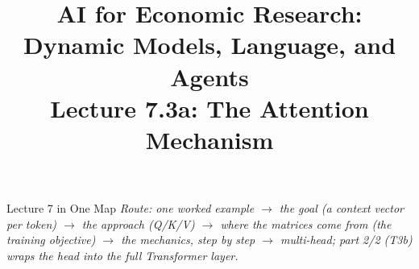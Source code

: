 



\graphicspath{{./pic/}{../../MiniCourse_8hr/Slides/Module3_LLM_Text/pic/}{../}}

\usetikzlibrary{arrows.meta,positioning,shapes,calc,fit,backgrounds}



\title[AI for Econ Research]{AI for Economic Research: Dynamic Models, Language, and Agents\\
Lecture 7.3a: The Attention Mechanism}



\makebeamertitle

\begin{frame}{Lecture 7 in One Map}
\medskip
\textit{\footnotesize Route: one worked example $\to$ the goal (a context vector per token) $\to$ the approach (Q/K/V) $\to$ where the matrices come from (the training objective) $\to$ the mechanics, step by step $\to$ multi-head; part 2/2 (T3b) wraps the head into the full Transformer layer.}
\end{frame}

